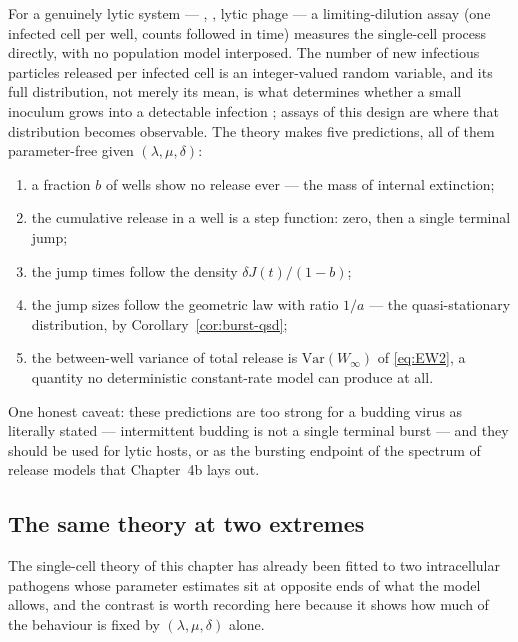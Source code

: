 For a genuinely lytic system --- \yp{}, \ft{}, lytic phage --- a
limiting-dilution assay (one infected cell per well, counts followed in
time) measures the single-cell process directly, with no population model
interposed. The number of new infectious particles released per infected
cell is an integer-valued random variable, and its full distribution, not
merely its mean, is what determines whether a small inoculum grows into a
detectable infection \cite{williams2024reproduction}; assays of this design
are where that distribution becomes observable. The theory makes five
predictions, all of them parameter-free given $(\lambda,\mu,\delta)$:
\begin{enumerate}
\item a fraction $b$ of wells show no release ever --- the mass of internal
extinction;
\item the cumulative release in a well is a step function: zero, then a
single terminal jump;
\item the jump times follow the density $\delta J(t)/(1-b)$;
\item the jump sizes follow the geometric law with ratio $1/a$ --- the
quasi-stationary distribution, by Corollary~\ref{cor:burst-qsd};
\item the between-well variance of total release is $\mathrm{Var}(W_\infty)$
of \eqref{eq:EW2}, a quantity no deterministic constant-rate model can
produce at all.
\end{enumerate}
One honest caveat: these predictions are too strong for a budding virus as
literally stated --- intermittent budding is not a single terminal burst ---
and they should be used for lytic hosts, or as the bursting endpoint of the
spectrum of release models that Chapter~4b lays out.

\subsection{The same theory at two extremes}
\label{sec:two-extremes}

The single-cell theory of this chapter has already been fitted to two
intracellular pathogens whose parameter estimates sit at opposite ends of
what the model allows, and the contrast is worth recording here because it
shows how much of the behaviour is fixed by $(\lambda,\mu,\delta)$ alone.

